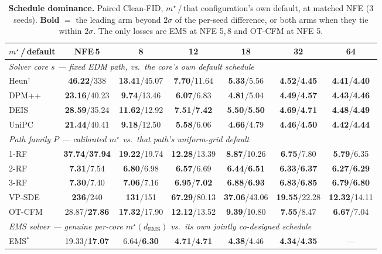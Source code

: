 \documentclass[11pt]{article}
\begin{document}
\begin{table}[t]\centering
\caption{\textbf{Schedule dominance.} Paired Clean-FID, $m^\star$\,/\,that
configuration's own default, at matched NFE (3 seeds). \textbf{Bold} $=$ the
leading arm beyond $2\sigma$ of the per-seed difference, or both arms when
they tie within $2\sigma$. The only losses are EMS at NFE 5,\,8 and OT-CFM at
NFE 5.}
\label{tab:dominance}
\footnotesize
\setlength{\tabcolsep}{4.5pt}
\begin{tabular}{l cccccc}
\toprule
$m^\star$\,/\,default & NFE\,5 & 8 & 12 & 18 & 32 & 64\\
\midrule
\multicolumn{7}{l}{\emph{Solver core $s$ --- fixed EDM path, vs.\ the core's own default schedule}}\\
Heun$^\dagger$ & \textbf{46.22}/338 & \textbf{13.41}/45.07 & \textbf{7.70}/11.64 & \textbf{5.33}/5.56 & \textbf{4.52}/\textbf{4.45} & \textbf{4.41}/\textbf{4.40}\\
DPM++          & \textbf{23.16}/40.23 & \textbf{9.74}/13.46 & \textbf{6.07}/6.83 & \textbf{4.81}/5.04 & \textbf{4.49}/\textbf{4.57} & \textbf{4.43}/\textbf{4.46}\\
DEIS           & \textbf{28.59}/35.24 & \textbf{11.62}/12.92 & \textbf{7.51}/\textbf{7.42} & \textbf{5.50}/\textbf{5.50} & \textbf{4.69}/\textbf{4.71} & \textbf{4.48}/\textbf{4.49}\\
UniPC          & \textbf{21.44}/40.41 & \textbf{9.18}/12.50 & \textbf{5.58}/6.06 & \textbf{4.66}/4.79 & \textbf{4.46}/\textbf{4.50} & \textbf{4.42}/\textbf{4.44}\\
\midrule
\multicolumn{7}{l}{\emph{Path family $P$ --- calibrated $m^\star$ vs.\ that path's uniform-grid default}}\\
1-RF   & \textbf{37.74}/\textbf{37.94} & \textbf{19.22}/19.74 & \textbf{12.28}/13.39 & \textbf{8.87}/10.26 & \textbf{6.75}/7.80 & \textbf{5.79}/6.35\\
2-RF   & \textbf{7.31}/7.54 & \textbf{6.80}/6.98 & \textbf{6.57}/6.69 & \textbf{6.44}/\textbf{6.51} & \textbf{6.33}/\textbf{6.37} & \textbf{6.27}/\textbf{6.29}\\
3-RF   & \textbf{7.30}/7.40 & \textbf{7.06}/7.16 & \textbf{6.95}/\textbf{7.02} & \textbf{6.88}/\textbf{6.93} & \textbf{6.83}/\textbf{6.85} & \textbf{6.79}/\textbf{6.80}\\
VP-SDE & \textbf{236}/240 & \textbf{131}/151 & \textbf{67.29}/80.13 & \textbf{37.06}/43.06 & \textbf{19.55}/22.28 & \textbf{12.32}/14.11\\
OT-CFM & 28.87/\textbf{27.86} & \textbf{17.32}/17.90 & \textbf{12.12}/13.52 & \textbf{9.39}/10.80 & \textbf{7.55}/8.47 & \textbf{6.67}/7.04\\
\midrule
\multicolumn{7}{l}{\emph{EMS solver --- genuine per-core $m^\star(d_{\mathrm{EMS}})$ vs.\ its own jointly co-designed schedule}}\\
EMS$^\ast$ & 19.33/\textbf{17.07} & 6.64/\textbf{6.30} & \textbf{4.71}/\textbf{4.71} & \textbf{4.38}/4.46 & \textbf{4.34}/\textbf{4.35} & ---\\
\bottomrule
\end{tabular}


\end{table}
\end{document}
